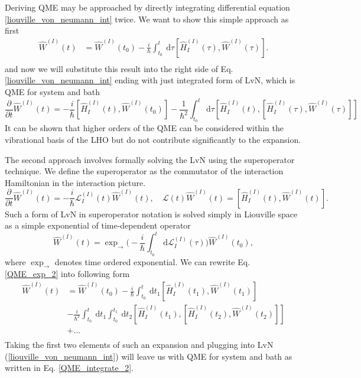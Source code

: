 Deriving QME may be approached by directly integrating differential equation \ref{liouville_von_neumann_int} twice. We want to show this simple approach as first
\begin{equation}
\label{QME_integrate_1}
    \begin{aligned}
    \hat{W}^{(I)}(t) &= \hat{W}^{(I)}(t_0) -\frac{i}{\hbar} \int_{t_0}^{t} \mathrm{~d} \tau [ \hat{H}_I^{(I)}(\tau), \hat{W}^{(I)}(\tau) ]. \\
    \end{aligned}
\end{equation}
and now we will substitute this result into the right side of Eq. \ref{liouville_von_neumann_int} ending with just integrated form of LvN, which is QME for system and bath
\begin{equation}
\label{QME_integrate_2}
    \frac{\partial}{\partial t}\hat{W}^{(I)}(t) = -\frac{i}{\hbar} [ \hat{H}_I^{(I)}(t), \hat{W}^{(I)}(t_0) ] -\frac{1}{\hbar^2} \int_{t_0}^{t} \mathrm{~d} \tau [ \hat{H}_I^{(I)}(t), [ \hat{H}_I^{(I)}(\tau), \hat{W}^{(I)}(\tau) ] ] 
\end{equation}
It can be shown that higher orders of the QME can be considered within the vibrational basis of the LHO but do not contribute significantly to the expansion.

The second approach involves formally solving the LvN using the superoperator technique. We define the superoperator as the commutator of the interaction Hamiltonian in the interaction picture. 
\begin{equation}
\label{QME_exp_1}
    \frac{\partial}{\partial t}\hat{W}^{(I)}(t) = -\frac{i}{\hbar} \mathcal{L}_I^{(I)}(t)\hat{W}^{(I)}(t), \quad \mathcal{L}(t)\hat{W}^{(I)}(t) = [ \hat{H}_I^{(I)}(t), \hat{W}^{(I)}(t) ].
\end{equation}
Such a form of LvN in superoperator notation is solved simply in Liouville space as a simple exponential of time-dependent operator
\begin{equation}
\label{QME_exp_2}
    \hat{W}^{(I)}(t) =  \exp_{\rightarrow} \Big( -\frac{i}{\hbar} \int_{t_0}^{t} \mathrm{~d} \mathcal{L}_I^{(I)}(\tau) \Big) \hat{W}^{(I)}(t_0) ,
\end{equation}
where $\exp_{\rightarrow}$ denotes time ordered exponential. We can rewrite Eq. \ref{QME_exp_2} into following form
\begin{equation}
\label{QME_exp_3}
    \begin{aligned}
    \hat{W}^{(I)}(t) &= \hat{W}^{(I)}(t_0) -\frac{i}{\hbar} \int_{t_0}^{t} \mathrm{~d} t_1 [ \hat{H}_I^{(I)}(t_1), \hat{W}^{(I)}(t_1) ] \\
    &-\frac{i}{\hbar^2} \int_{t_0}^{t} \mathrm{~d} t_1 \int_{t_0}^{t_1} \mathrm{~d} t_2 [ \hat{H}_I^{(I)}(t_1), [ \hat{H}_I^{(I)}(t_2), \hat{W}^{(I)}(t_2) ] ] \\
    &+ \ldots \\
    \end{aligned}
\end{equation}
Taking the first two elements of such an expansion and plugging into LvN (\ref{liouville_von_neumann_int}) will leave us with QME for system and bath as written in Eq. \ref{QME_integrate_2}.

